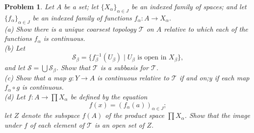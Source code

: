 \documentclass{article}
\newtheorem{problem}{Problem}
\begin{document}
\begin{problem}
Let $A$ be a set; let $\{X_{\alpha}\}_{\alpha \in J}$ be an indexed family of spaces; and let $\{f_{\alpha}\}_{\alpha \in J}$ be an indexed family of functions $f_{\alpha} : A \to X_{\alpha}$.\\
(a) Show there is a unique coarsest topology $\mathcal{T}$ on $A$ relative to which each of the functions $f_{\alpha}$ is continuous.\\
(b) Let
\[
\mathcal{S}_{\beta} = \{f^{-1}_{\beta}(U_{\beta}) \mid \text{$U_{\beta}$ is open in $X_{\beta}$}\},
\]
and let $\mathcal{S} = \bigcup \mathcal{S}_{\beta}$. Show that $\mathcal{T}$ is a subbasis for $\mathcal{T}$.\\
(c) Show that a map $g : Y \to A$ is continuous relative to $\mathcal{T}$ if and on;y if each map $f_{\alpha} \circ g$ is continuous.\\
(d) Let $f : A \to \prod X_{\alpha}$ be defined by the equation
\[
f(x) = (f_{\alpha}(a))_{\alpha \in J};
\]
let $Z$ denote the subspace $f(A)$ of the product space $\prod X_{\alpha}$. Show that the image under $f$ of each element of $\mathcal{T}$ is an open set of $Z$.
\end{problem}
\end{document}
